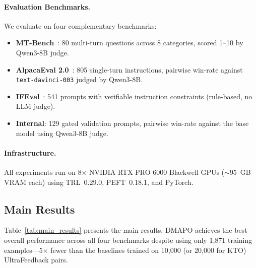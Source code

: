 \documentclass[10pt,twocolumn]{article}
\newcommand{\ours}{\textsc{DMAPO}}
\begin{document}
\paragraph{Evaluation Benchmarks.}
We evaluate on four complementary benchmarks:
\begin{itemize}[leftmargin=*,itemsep=1pt,topsep=2pt]
  \item \textbf{MT-Bench}~\cite{zheng2024judging}: 80 multi-turn questions across 8 categories, scored 1--10 by Qwen3-8B judge.
  \item \textbf{AlpacaEval 2.0}~\cite{li2023alpacaeval}: 805 single-turn instructions, pairwise win-rate against \texttt{text-davinci-003} judged by Qwen3-8B.
  \item \textbf{IFEval}~\cite{zhou2023ifeval}: 541 prompts with verifiable instruction constraints (rule-based, no LLM judge).
  \item \textbf{Internal}: 129 gated validation prompts, pairwise win-rate against the base model using Qwen3-8B judge.
\end{itemize}

\paragraph{Infrastructure.}
All experiments run on 8$\times$ NVIDIA RTX PRO 6000 Blackwell GPUs ($\sim$95~GB VRAM each) using TRL~0.29.0, PEFT~0.18.1, and PyTorch.



\subsection{Main Results}
\label{sec:main_results}

Table~\ref{tab:main_results} presents the main results.
\ours{} achieves the best overall performance across all four benchmarks despite using only 1{,}871 training examples---5$\times$ fewer than the baselines trained on 10{,}000 (or 20{,}000 for KTO) UltraFeedback pairs.
\end{document}
